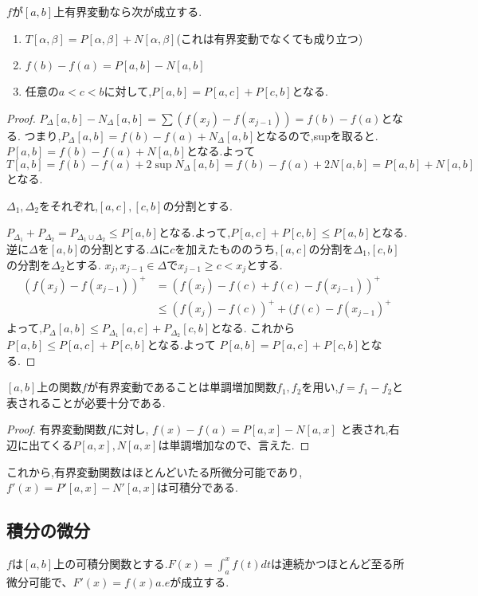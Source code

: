 \begin{lem}
$f$が$[a, b]$上有界変動なら次が成立する.
\begin{enumerate}
    \item  $T[\alpha, \beta] = P[\alpha, \beta] + N[\alpha, \beta]$(これは有界変動でなくても成り立つ)
    \item $f(b) - f(a) = P[a, b] - N[a,b]$
    \item 任意の$a < c < b$に対して,$P[a, b]= P[a, c] + P[c,b]$となる.
\end{enumerate}
\begin{proof}
$P_{\Delta}[a, b] - N_{\Delta}[a, b] = \sum (f(x_j) - f(x_{j-1})) = f(b) - f(a)$となる.
つまり,$P_{\Delta}[a, b] = f(b) - f(a) + N_{\Delta}[a, b]$となるので,supを取ると.
$P[a,b] = f(b) - f(a)  + N[a, b]$となる.よって
$T[a,b]= f(b) - f(a) + 2\sup  N_{\Delta}[a, b] = f(b) - f(a) + 2 N[a, b] =  P[a, b] + N[a, b]$となる.

$\Delta_1, \Delta_2$をそれぞれ,$[a,c], [c,b]$の分割とする.

$P_{\Delta_1} + P_{\Delta_2} = P_{\Delta_1 \cup \Delta_2} \le P[a, b]$となる.よって,$P[a, c] + P[c, b] \le P[a, b]$となる.
逆に$\Delta$を$[a, b]$の分割とする.$\Delta$に$c$を加えたもののうち,$[a, c]$の分割を$\Delta_1$,$[c,b]$の分割を$\Delta_2$とする.
$x_j, x_{j-1} \in \Delta$で$x_{j-1} \ge c <  x_j$とする.
\begin{align*}
\left(f(x_j) - f(x_{j-1})\right)^+ &= (f(x_j) - f(c) + f(c) - f(x_{j-1}))^+ \\
       &\le (f(x_j) - f(c))^+ + (f(c) - f(x_{j-1})^+
\end{align*}
よって,$P_{\Delta}[a, b]  \le P_{\Delta_1}[a, c] + P_{\Delta_2}[c, b]$となる.
これから$P[a, b] \le P[a, c] + P[c, b]$となる.よって
$P[a, b] = P[a, c] + P[c, b]$となる.
\end{proof}
\end{lem}

\begin{thm}
$[a, b]$上の関数$f$が有界変動であることは単調増加関数$f_1,f_2$を用い,$f = f_1 - f_2$と表されることが必要十分である.
\end{thm}
\begin{proof}
有界変動関数$f$に対し,
$f(x) - f(a) = P[a, x] - N[a, x]$
と表され,右辺に出てくる$P[a,x], N[a,x]$は単調増加なので、言えた.
\end{proof}
これから,有界変動関数はほとんどいたる所微分可能であり,$f'(x) = P'[a,x] - N'[a, x]$は可積分である.

\subsection{積分の微分}
\begin{thm}
$f$は$[a, b]$上の可積分関数とする.$F(x) = \int_a^x f(t)dt$は連続かつほとんど至る所微分可能で、$F'(x) = f(x) a.e$が成立する.

\end{thm}


